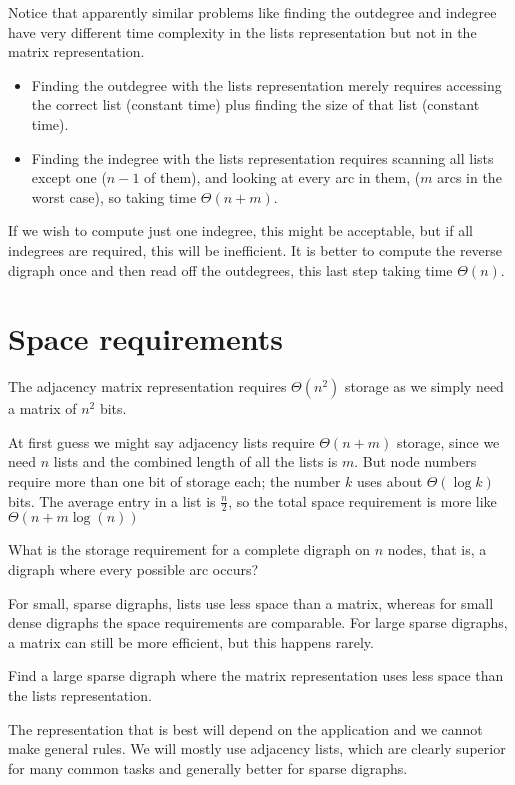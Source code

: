 Notice that apparently similar problems like finding the outdegree and indegree 
have very different time complexity in the lists representation but not in the matrix representation. 
\begin{itemize}
  \item Finding the outdegree with the lists representation merely requires accessing
the correct list (constant time) plus finding the size of that list
(constant time). 
\item Finding the indegree with the lists representation requires
scanning all lists except one ($n-1$ of them), and looking at every arc in
them, ($m$ arcs in the worst case), so taking time $\Theta(n+m)$. 
\end{itemize}

If we wish to compute just one indegree, this might be acceptable, 
but if all indegrees are required, this will be inefficient. 
It is better to compute the reverse digraph once
and then read off the outdegrees, this last step taking time $\Theta(n)$.

\section{Space requirements}
The adjacency matrix representation requires $\Theta(n^2)$ storage 
as we simply need a matrix of $n^2$ bits. 

At first guess we might say adjacency lists require $\Theta(n + m)$ storage, 
since we need $n$ lists and the combined length of all the lists is $m$.
But node numbers require more than one bit of storage each; the number $k$ uses about $\Theta(\log k)$ bits.
The average entry in a list is $\frac n 2$, so the total space requirement is more like $\Theta(n + m \log(n))$ 

\begin{Boxample}[2]
What is the storage requirement for a complete digraph on $n$ nodes, that is, a digraph where every possible arc
occurs?
\end{Boxample}

For small, sparse digraphs, lists use less space than a matrix, whereas for small
dense digraphs the space requirements are comparable. For large sparse
digraphs, a matrix can still be more efficient, but this happens rarely.

\begin{Boxample}[2]
Find a large sparse digraph where the matrix representation uses less space than the lists representation.
\end{Boxample}

The representation that is best will depend on the application and we cannot make general rules.  
We will mostly use adjacency lists, which are
clearly superior for many common tasks and generally better for sparse digraphs.

